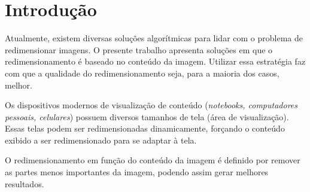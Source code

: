 \section{Introdução}

Atualmente, existem diversas soluções algorítmicas para lidar com o 
problema de redimensionar imagens. O presente trabalho apresenta
soluções em que o redimensionamento é baseado no conteúdo da imagem.
Utilizar essa estratégia faz com que a qualidade do redimensionamento 
seja, para a maioria dos casos, melhor. 

Os dispositivos modernos de visualização de conteúdo (\emph{notebooks,
computadores pessoais, celulares}) possuem diversos tamanhos de tela (área
de visualização). Essas telas podem ser redimensionadas dinamicamente, 
forçando o conteúdo exibido a ser redimensionado para se adaptar à tela.

O redimensionamento em função do conteúdo da imagem é definido por remover
as partes menos importantes da imagem, podendo assim gerar melhores 
resultados.

